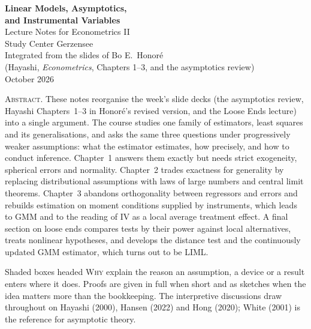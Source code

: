 \documentclass[11pt,a4paper]{article}
\begin{document}
\thispagestyle{empty}
\begin{center}
\vspace*{2.2cm}
{\LARGE\bfseries Linear Models, Asymptotics,\\[6pt] and Instrumental Variables}\\[1.2cm]
{\large Lecture Notes for Econometrics II}\\[4pt]
{\large Study Center Gerzensee}\\[1.4cm]
{\normalsize Integrated from the slides of Bo E.\ Honor\'e\\ (Hayashi, \emph{Econometrics}, Chapters 1--3, and the asymptotics review)}\\[0.6cm]
{\normalsize October 2026}
\end{center}

\vspace{1.6cm}
\begin{center}
\begin{minipage}{0.84\textwidth}
\small
\noindent\textsc{Abstract.}\enspace
These notes reorganise the week's slide decks (the asymptotics review, Hayashi Chapters~1--3 in Honor\'e's revised version, and the Loose Ends lecture) into a single argument. The course studies one family of estimators, least squares and its generalisations, and asks the same three questions under progressively weaker assumptions: what the estimator estimates, how precisely, and how to conduct inference. Chapter~1 answers them exactly but needs strict exogeneity, spherical errors and normality. Chapter~2 trades exactness for generality by replacing distributional assumptions with laws of large numbers and central limit theorems. Chapter~3 abandons orthogonality between regressors and errors and rebuilds estimation on moment conditions supplied by instruments, which leads to GMM and to the reading of IV as a local average treatment effect. A final section on loose ends compares tests by their power against local alternatives, treats nonlinear hypotheses, and develops the distance test and the continuously updated GMM estimator, which turns out to be LIML.

\smallskip
\noindent Shaded boxes headed \textsc{Why} explain the reason an assumption, a device or a result enters where it does. Proofs are given in full when short and as sketches when the idea matters more than the bookkeeping. The interpretive discussions draw throughout on Hayashi (2000), Hansen (2022) and Hong (2020); White (2001) is the reference for asymptotic theory.
\end{minipage}
\end{center}
\end{document}
